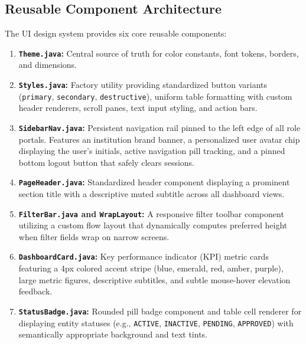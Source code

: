 \subsection{Reusable Component Architecture}
The UI design system provides six core reusable components:
\begin{enumerate}
    \item \textbf{\texttt{Theme.java}:} Central source of truth for color constants, font tokens, borders, and dimensions.
    \item \textbf{\texttt{Styles.java}:} Factory utility providing standardized button variants (\texttt{primary}, \texttt{secondary}, \texttt{destructive}), uniform table formatting with custom header renderers, scroll panes, text input styling, and action bars.
    \item \textbf{\texttt{SidebarNav.java}:} Persistent navigation rail pinned to the left edge of all role portals. Features an institution brand banner, a personalized user avatar chip displaying the user's initials, active navigation pill tracking, and a pinned bottom logout button that safely clears sessions.
    \item \textbf{\texttt{PageHeader.java}:} Standardized header component displaying a prominent section title with a descriptive muted subtitle across all dashboard views.
    \item \textbf{\texttt{FilterBar.java} and \texttt{WrapLayout}:} A responsive filter toolbar component utilizing a custom flow layout that dynamically computes preferred height when filter fields wrap on narrow screens.
    \item \textbf{\texttt{DashboardCard.java}:} Key performance indicator (KPI) metric cards featuring a 4px colored accent stripe (blue, emerald, red, amber, purple), large metric figures, descriptive subtitles, and subtle mouse-hover elevation feedback.
    \item \textbf{\texttt{StatusBadge.java}:} Rounded pill badge component and table cell renderer for displaying entity statuses (e.g., \texttt{ACTIVE}, \texttt{INACTIVE}, \texttt{PENDING}, \texttt{APPROVED}) with semantically appropriate background and text tints.
\end{enumerate}

